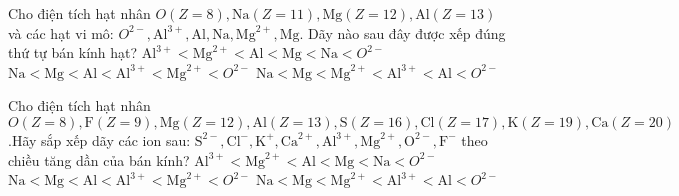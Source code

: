 \setcounter{ex}{25}
\begin{ex}
	Cho điện tích hạt nhân $O(Z=8), \mathrm{Na}(Z=11), \mathrm{Mg}(Z=12), \mathrm{Al}(Z=13)$ và các hạt vi mô: $O^{2-}, \mathrm{Al}^{3+}, \mathrm{Al}, \mathrm{Na}, \mathrm{Mg}^{2+}, \mathrm{Mg}$. Dãy nào sau đây được xếp đúng thứ tự bán kính hạt?
	{$\mathrm{Al}^{3+} < \mathrm{Mg}^{2+} < \mathrm{Al} < \mathrm{Mg} < \mathrm{Na} < O^{2-}$}
	{$\mathrm{Na} < \mathrm{Mg} < \mathrm{Al} < \mathrm{Al}^{3+} < \mathrm{Mg}^{2+} < O^{2-}$}
	{$\mathrm{Na} < \mathrm{Mg} < \mathrm{Mg}^{2+} < \mathrm{Al}^{3+} < \mathrm{Al} < O^{2-}$}
	\loigiai{}
\end{ex}
\begin{ex}
	Cho điện tích hạt nhân $O(Z=8), \mathrm{F}(Z=9), \mathrm{Mg}(Z=12), \mathrm{Al}(Z=13),\mathrm{S}(Z=16),\mathrm{Cl}(Z=17),\mathrm{K}(Z=19),\mathrm{Ca}(Z=20)$.Hãy sắp xếp dãy các ion sau: $\mathrm{S}^{2-},\mathrm{Cl}^{-},\mathrm{K}^{+},\mathrm{Ca}^{2+},\mathrm{Al}^{3+},\mathrm{Mg}^{2+},\mathrm{O}^{2-},\mathrm{F}^{-} $ theo chiều tăng dần của bán kính?
	{$\mathrm{Al}^{3+} < \mathrm{Mg}^{2+} < \mathrm{Al} < \mathrm{Mg} < \mathrm{Na} < O^{2-}$}
	{$\mathrm{Na} < \mathrm{Mg} < \mathrm{Al} < \mathrm{Al}^{3+} < \mathrm{Mg}^{2+} < O^{2-}$}
	{$\mathrm{Na} < \mathrm{Mg} < \mathrm{Mg}^{2+} < \mathrm{Al}^{3+} < \mathrm{Al} < O^{2-}$}
	\loigiai{}
\end{ex}
\label{\x}
